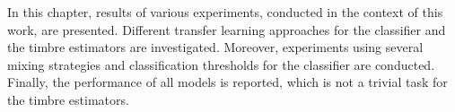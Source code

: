 In this chapter, results of various experiments, conducted in the context of this work, are presented. Different transfer learning approaches for the classifier and the timbre estimators are investigated. Moreover, experiments using several mixing strategies and classification thresholds for the classifier are conducted. Finally, the performance of all models is reported, which is not a trivial task for the timbre estimators.


